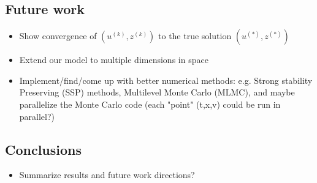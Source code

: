 \documentclass{article}  %
\begin{document}
\subsection{Future work}
\begin{itemize}
    \item Show convergence of $(u^{(k)},z^{(k)})$ to the true solution $(u^{(*)},z^{(*)})$
    \item Extend our model to multiple dimensions in space 
    \item Implement/find/come up with better numerical methods: e.g. Strong stability Preserving (SSP) methods, Multilevel Monte Carlo (MLMC), and maybe parallelize the Monte Carlo code (each "point" (t,x,v) could be run in parallel?)
\end{itemize}

\subsection{Conclusions}
\begin{itemize}
    \item Summarize results and future work directions?
\end{itemize}

% 
% 
\nocite{*}
\printbibliography
%
\end{document}
